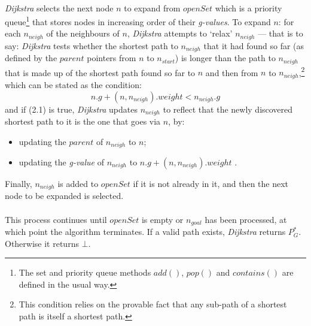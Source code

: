 \documentclass[12pt,notitlepage]{report}
\begin{document}
\\
\noindent
{\em Dijkstra} selects the next node $n$ to expand from $openSet$ which is a priority queue\footnote{The set and priority queue methods $add()$, $pop()$ and  $contains()$ are defined in the usual way.} that stores nodes in increasing order of their {\em g-values}. To expand $n$: for each $n_{neigh}$ of the neighbours of $n$, {\em Dijkstra} attempts to `relax' $n_{neigh}$ --- that is to say: {\em Dijkstra} tests whether the shortest path to $n_{neigh}$ that it had found so far (as defined by the $parent$ pointers from $n$ to $n_{start}$) is longer than the path to $n_{neigh}$ that is made up of the shortest path found so far to $n$ and then from $n$ to $n_{neigh}$,\footnote{This condition relies on the provable\cite{CormenDijkstra} fact that any sub-path of a shortest path is itself a shortest path.} which can be stated as the condition:
\begin{equation}
n.g + (n,n_{neigh}).weight < n_{neigh}.g
\end{equation}
\noindent
and if (2.1) is true, {\em Dijkstra} updates $n_{neigh}$ to reflect that the newly discovered shortest path to it is the one that goes via $n$, by: 
\begin{itemize}
\item updating the $parent$ of $n_{neigh}$ to $n$;
\item updating the {\em g-value} of $n_{neigh}$ to $n.g + (n,n_{neigh}).weight$ .
\end{itemize}
Finally, $n_{neigh}$ is added to $openSet$ if it is not already in it, and then the next node to be expanded is selected.\\

\\
\noindent
This process continues until $openSet$ is empty or $n_{goal}$ has been processed, at which point the algorithm terminates. If a valid path exists, {\em Dijkstra} returns $P^{*}_{G}$. Otherwise it returns $\bot$.\
\end{document}
